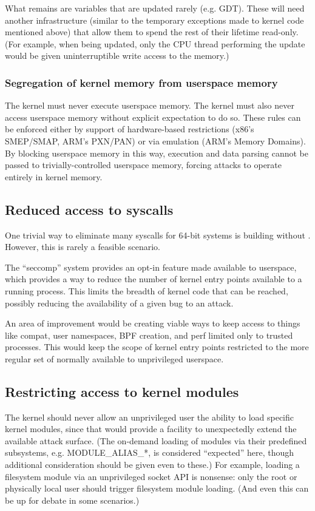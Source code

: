 \documentclass[a4paper,8pt,english]{sphinxmanual}
\begin{document}
What remains are variables that are updated rarely (e.g. GDT). These
will need another infrastructure (similar to the temporary exceptions
made to kernel code mentioned above) that allow them to spend the rest
of their lifetime read-only. (For example, when being updated, only the
CPU thread performing the update would be given uninterruptible write
access to the memory.)


\subsubsection{Segregation of kernel memory from userspace memory}
\label{security/self-protection:segregation-of-kernel-memory-from-userspace-memory}
The kernel must never execute userspace memory. The kernel must also never
access userspace memory without explicit expectation to do so. These
rules can be enforced either by support of hardware-based restrictions
(x86's SMEP/SMAP, ARM's PXN/PAN) or via emulation (ARM's Memory Domains).
By blocking userspace memory in this way, execution and data parsing
cannot be passed to trivially-controlled userspace memory, forcing
attacks to operate entirely in kernel memory.


\subsection{Reduced access to syscalls}
\label{security/self-protection:reduced-access-to-syscalls}
One trivial way to eliminate many syscalls for 64-bit systems is building
without . However, this is rarely a feasible scenario.

The ``seccomp'' system provides an opt-in feature made available to
userspace, which provides a way to reduce the number of kernel entry
points available to a running process. This limits the breadth of kernel
code that can be reached, possibly reducing the availability of a given
bug to an attack.

An area of improvement would be creating viable ways to keep access to
things like compat, user namespaces, BPF creation, and perf limited only
to trusted processes. This would keep the scope of kernel entry points
restricted to the more regular set of normally available to unprivileged
userspace.


\subsection{Restricting access to kernel modules}
\label{security/self-protection:restricting-access-to-kernel-modules}
The kernel should never allow an unprivileged user the ability to
load specific kernel modules, since that would provide a facility to
unexpectedly extend the available attack surface. (The on-demand loading
of modules via their predefined subsystems, e.g. MODULE\_ALIAS\_*, is
considered ``expected'' here, though additional consideration should be
given even to these.) For example, loading a filesystem module via an
unprivileged socket API is nonsense: only the root or physically local
user should trigger filesystem module loading. (And even this can be up
for debate in some scenarios.)
\end{document}
